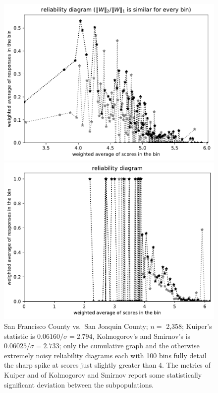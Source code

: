 \documentclass{article}
\newlength{\imsize}
\begin{document}
\begin{figure}
\begin{centering}
\parbox{\imsize}{\includegraphics[width=\imsize]
{../codes/weighted/County_of_San_Francisco_vs_San_Joaquin-LNGI/equierrs100.pdf}}
\quad\quad
\parbox{\imsize}{\includegraphics[width=\imsize]
{../codes/weighted/County_of_San_Francisco_vs_San_Joaquin-LNGI/equiscores100.pdf}}

\end{centering}
\caption{San Francisco County vs.\ San Joaquin County; $n =$ 2,358;
         Kuiper's statistic is $0.06160 / \sigma = 2.794$,
         Kolmogorov's and Smirnov's is $0.06025 / \sigma = 2.733$;
         only the cumulative graph and the otherwise extremely noisy
         reliability diagrams each with 100 bins fully detail the sharp spike
         at scores just slightly greater than 4.
         The metrics of Kuiper and of Kolmogorov and Smirnov report
         some statistically significant deviation between the subpopulations.
}
\label{San_Francisco-San_Joaquin}
\end{figure}
\end{document}
